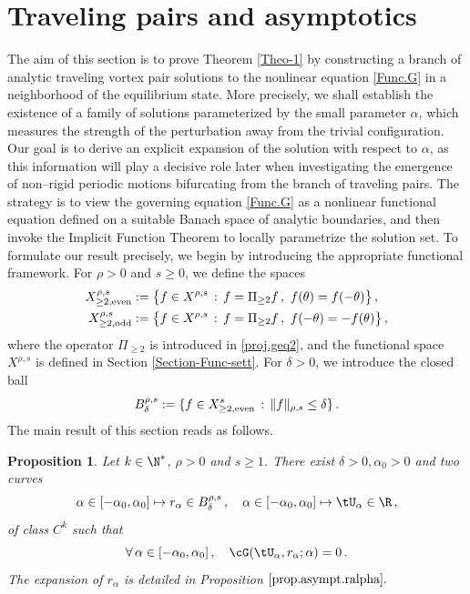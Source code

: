 \documentclass[a4paper,reqno,10pt]{article}
\newtheorem{pro}{Proposition}[section]
\begin{document}
\section{Traveling pairs  and asymptotics}\label{Traveling pairs}
The aim of this section is to prove Theorem \ref{Theo-1} by  constructing a branch of analytic traveling vortex pair solutions to the nonlinear equation \eqref{Func.G} in a neighborhood of the equilibrium state. More precisely, we shall establish the existence of a family of solutions parameterized by the small parameter $\alpha$, which measures the strength of the perturbation away from the trivial configuration. Our goal is to derive an explicit expansion of the solution with respect to $\alpha$, as this information will play a decisive role later when investigating the emergence of non–rigid periodic motions bifurcating from the branch of traveling pairs. The strategy is to view the governing equation \eqref{Func.G} as a nonlinear functional equation defined on a suitable Banach space of analytic boundaries, and then invoke the Implicit Function Theorem to locally parametrize the solution set.
To formulate our result precisely, we begin by introducing the appropriate functional framework.
For  $\rho>0$ and $s\geq 0$, we define the spaces
\begin{equation}\label{spaces.evenodd}
	\begin{aligned}
		X_{\geq 2, \rm even}^{\rho,s} &:= \big\{ f \in X^{\rho,s} \, : \, f= \Pi_{\geq 2} f \,, \ f(\theta)=f(-\theta) \big\} \,, \\
		X_{\geq 2, \rm odd}^{\rho,s} & := \big\{ f \in X^{\rho,s} \, : \, f= \Pi_{\geq 2} f \,, \ f(-\theta)=-f(\theta) \big\} \,,
	\end{aligned}
\end{equation}
where the operator $\Pi_{\geq 2}$ is introduced  in \eqref{proj.geq2}, and the functional  space $X^{\rho,s}$ is defined in Section \ref{Section-Func-sett}.
For $\delta>0$, we introduce  the closed ball
\begin{equation}\label{ball.even.small}
	B_\delta^{\rho,s} := \{ f \in X_{\geq 2, \rm even}^s \, : \, \| f\|_{\rho,s} \leq \delta \}\,.
\end{equation}
The main result of this section reads as follows.
\begin{pro}\label{prop.ralpha}
   Let $k\in\N^*$, $\rho>0$ and $s\geq 1$. There exist $\delta>0, \alpha_0>0$ and two curves 
   $$\alpha\in[-\alpha_0,\alpha_0]\mapsto r_\alpha\in B_\delta^{\rho,s}\,, \quad \alpha\in[-\alpha_0,\alpha_0]\mapsto \tU_\alpha\in\R \,,
   $$
   of  class $C^k$ such that
   $$
   \forall \,\alpha\in [-\alpha_0,\alpha_0]\,,\quad \cG(\tU_\alpha,r_\alpha;\alpha)=0 \,.
   $$
   The expansion of $r_\alpha$ is detailed in Proposition $\ref{prop.asympt.ralpha}.$
\end{pro}
\end{document}
